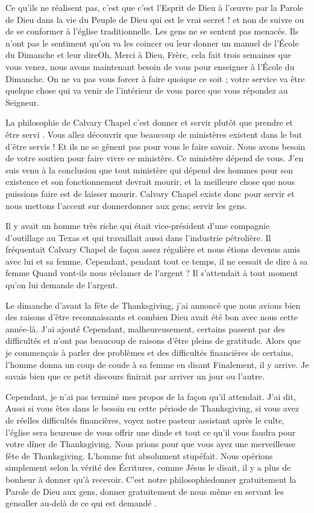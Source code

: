 Ce qu’ils ne réalisent pas, c’est que c’est l’Esprit de Dieu à l’œuvre par la Parole de Dieu dans la vie du Peuple de Dieu
qui est le vrai secret ! et non de suivre ou de se conformer à l’église traditionnelle. Les gens ne se sentent pas
menacés. Ils n’ont pas le sentiment qu’on va les coincer ou leur donner un manuel de l’École du Dimanche et leur
dire\frcolon\og Oh, Merci à Dieu, Frère, cela fait trois semaines que vous venez, nous avons maintenant besoin de vous pour
enseigner à l’École du Dimanche.\fg{} On ne va pas vous forcer à faire quoique ce soit ; votre service va être quelque
chose qui va venir de l'intérieur de vous parce que vous répondez au Seigneur.

La philosophie de Calvary Chapel c’est \og donner et servir \fg{} plutôt que \og prendre et être servi \fg{}. Vous allez découvrir
que beaucoup de ministères existent dans le but d’être servis ! Et ils ne se gênent pas pour vous le faire savoir. \og Nous
avons besoin de votre soutien pour faire vivre ce ministère. Ce ministère dépend de vous.\fg{} J’en suis venu à la
conclusion que tout ministère qui dépend des hommes pour son existence et son fonctionnement devrait mourir, et la
meilleure chose que nous puissions faire est de laisser mourir. Calvary Chapel existe donc pour servir et nous mettons
l’accent sur donner\frcolon donner aux gens; servir les gens.

Il y avait un homme très riche qui était vice-président d’une compagnie d’outillage au Texas et qui travaillait aussi
dans l’industrie pétrolière. Il fréquentait Calvary Chapel de façon assez régulière et nous étions devenus amis avec lui
et sa femme. Cependant, pendant tout ce temps, il ne cessait de dire à sa femme \og Quand vont-ils nous réclamer de
l’argent ?\fg{} Il s’attendait à tout moment qu’on lui demande de l'argent.

Le dimanche d’avant la fête de Thanksgiving, j’ai annoncé que nous avions bien des raisons d’être reconnaissants et
combien Dieu avait été bon avec nous cette année-là. J’ai ajouté \og Cependant, malheureusement, certains passent par
des difficultés et n’ont pas beaucoup de raisons d’être pleins de gratitude.\fg{} Alors que je commençais à parler des
problèmes et des difficultés financières de certains, l’homme donna un coup de coude à sa femme en disant\frcolon
\og Finalement, il y arrive. Je savais bien que ce petit discours finirait par arriver un jour ou l’autre.\fg{}

Cependant, je n'ai pas terminé mes propos de la façon qu’il attendait. J'ai dit, \og Aussi si vous êtes dans le besoin en
cette période de Thanksgiving, si vous avez de réelles difficultés financières, voyez notre pasteur assistant après le
culte, l’église sera heureuse de vous offrir une dinde et tout ce qu’il vous faudra pour votre dîner de Thanksgiving.
Nous prions pour que vous ayez une merveilleuse fête de Thanksgiving.\fg{} L’homme fut absolument stupéfait. Nous
opérions simplement selon la vérité des Écritures, comme Jésus le disait, il y a plus de bonheur à donner qu’à
recevoir. C’est notre philosophie\frcolon donner gratuitement la Parole de Dieu aux gens, donner gratuitement de nous
même en servant les gens\frcolon aller au-delà de ce qui est demandé .

